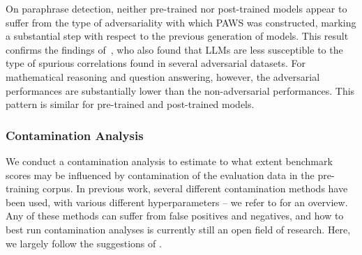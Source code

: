 \documentclass[dvipsnames]{fairmeta}
\begin{document}
On paraphrase detection, neither pre-trained nor post-trained models appear to suffer from the type of adversariality with which PAWS was constructed, marking a substantial step with respect to the previous generation of models.
This result confirms the findings of~\citet{weber-etal-2023-mind}, who also found that LLMs are less susceptible to the type of spurious correlations found in several adversarial datasets.
For mathematical reasoning and question answering, however, the adversarial performances are substantially lower than the non-adversarial performances.
This pattern is similar for pre-trained and post-trained models.

\subsubsection{Contamination Analysis}
\label{subsec:contamination_analysis}

We conduct a contamination analysis to estimate to what extent benchmark scores may be influenced by contamination of the evaluation data in the pre-training corpus.
In previous work, several different contamination methods have been used, with various different hyperparameters -- we refer to \citet{singh2024contamination} for an overview.
Any of these methods can suffer from false positives and negatives, and how to best run contamination analyses is currently still an open field of research.
Here, we largely follow the suggestions of \citet{singh2024contamination}.
\end{document}
